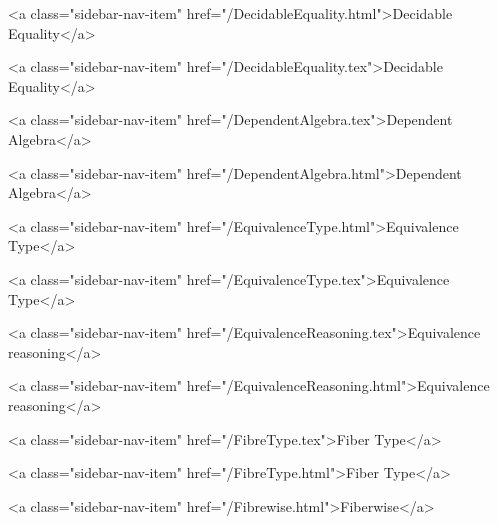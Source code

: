       
    
      
        
          <a class="sidebar-nav-item" href="/DecidableEquality.html">Decidable Equality</a>
        
      
    
      
        
          <a class="sidebar-nav-item" href="/DecidableEquality.tex">Decidable Equality</a>
        
      
    
      
        
          <a class="sidebar-nav-item" href="/DependentAlgebra.tex">Dependent Algebra</a>
        
      
    
      
        
          <a class="sidebar-nav-item" href="/DependentAlgebra.html">Dependent Algebra</a>
        
      
    
      
        
          <a class="sidebar-nav-item" href="/EquivalenceType.html">Equivalence Type</a>
        
      
    
      
        
          <a class="sidebar-nav-item" href="/EquivalenceType.tex">Equivalence Type</a>
        
      
    
      
        
          <a class="sidebar-nav-item" href="/EquivalenceReasoning.tex">Equivalence reasoning</a>
        
      
    
      
        
          <a class="sidebar-nav-item" href="/EquivalenceReasoning.html">Equivalence reasoning</a>
        
      
    
      
        
          <a class="sidebar-nav-item" href="/FibreType.tex">Fiber Type</a>
        
      
    
      
        
          <a class="sidebar-nav-item" href="/FibreType.html">Fiber Type</a>
        
      
    
      
        
          <a class="sidebar-nav-item" href="/Fibrewise.html">Fiberwise</a>
        
